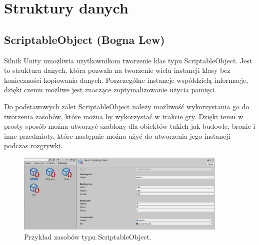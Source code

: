 \section{Struktury danych}
\subsection{ScriptableObject (Bogna Lew)}
Silnik Unity umożliwia użytkownikom tworzenie klas typu ScriptableObject. Jest to struktura danych, która pozwala na
tworzenie wielu instancji klasy bez konieczności kopiowania danych. Poszczególne instancje współdzielą informacje, dzięki
czemu możliwe jest znaczące zoptymalizowanie użycia pamięci.

Do podstawowych zalet ScriptableObject należy możliwość wykorzystania go do tworzenia zasobów, które można by wykorzystać
w trakcie gry. Dzięki temu w prosty sposób można utworzyć szablony dla obiektów takich jak budowle, bronie i inne
przedmioty, które następnie można użyć do utworzenia jego instancji podczas rozgrywki.

\begin{figure}[h!]
    \centering
    \includegraphics[width=0.9\textwidth]{images/scriptableobjects.png}
    \caption{Przykład zasobów typu ScriptableObject.}
\end{figure}